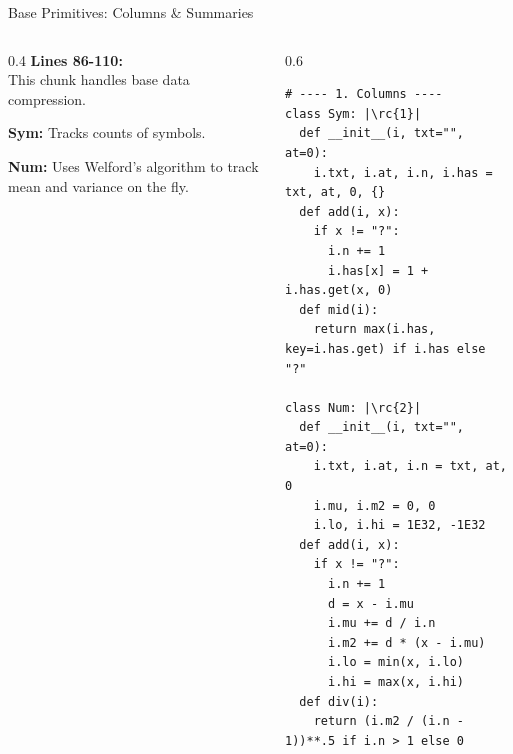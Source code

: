 \begin{frame}[fragile]{Base Primitives: Columns \& Summaries}
\begin{columns}[T]
  \begin{column}{0.4\textwidth}
    \footnotesize 
    \textbf{Lines 86-110:}\\
    This chunk handles base data compression. 

    \vspace{0.2cm}
     \textbf{Sym:} Tracks counts of symbols.
    
    \vspace{0.15cm}
     \textbf{Num:} Uses Welford's algorithm to track mean and variance on the fly.
  \end{column}
  
  \begin{column}{0.6\textwidth}
\begin{verbatim}
# ---- 1. Columns ----
class Sym: |\rc{1}|
  def __init__(i, txt="", at=0):
    i.txt, i.at, i.n, i.has = txt, at, 0, {}
  def add(i, x):
    if x != "?":
      i.n += 1
      i.has[x] = 1 + i.has.get(x, 0)
  def mid(i): 
    return max(i.has, key=i.has.get) if i.has else "?"

class Num: |\rc{2}|
  def __init__(i, txt="", at=0):
    i.txt, i.at, i.n = txt, at, 0
    i.mu, i.m2 = 0, 0
    i.lo, i.hi = 1E32, -1E32
  def add(i, x):
    if x != "?":
      i.n += 1
      d = x - i.mu
      i.mu += d / i.n
      i.m2 += d * (x - i.mu)
      i.lo = min(x, i.lo)
      i.hi = max(x, i.hi)
  def div(i): 
    return (i.m2 / (i.n - 1))**.5 if i.n > 1 else 0
\end{verbatim}
  \end{column}
\end{columns}
\end{frame}
